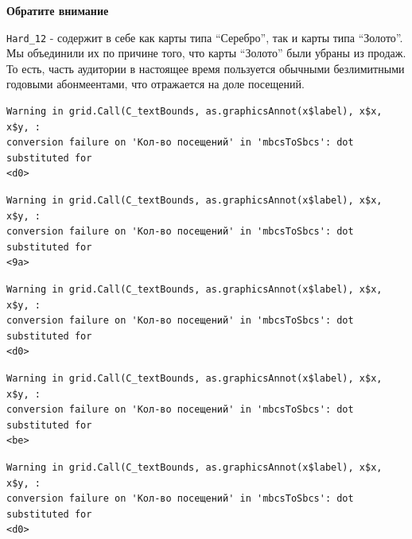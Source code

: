 \documentclass[
  letterpaper,
  DIV=11,
  numbers=noendperiod]{scrartcl}
\begin{document}
\begin{tcolorbox}[enhanced jigsaw, colframe=quarto-callout-important-color-frame, leftrule=.75mm, rightrule=.15mm, toprule=.15mm, left=2mm, arc=.35mm, bottomrule=.15mm, colback=white, breakable, opacityback=0]
\begin{minipage}[t]{5.5mm}
\textcolor{quarto-callout-important-color}{\faExclamation}
\end{minipage}%
\begin{minipage}[t]{\textwidth - 5.5mm}

\textbf{Обратите внимание}\vspace{2mm}

\texttt{Hard\_12} - содержит в себе как карты типа ``Серебро'', так и
карты типа ``Золото''. Мы объединили их по причине того, что карты
``Золото'' были убраны из продаж. То есть, часть аудитории в настоящее
время пользуется обычными безлимитными годовыми абонмеентами, что
отражается на доле посещений.

\end{minipage}%
\end{tcolorbox}

\begin{verbatim}
Warning in grid.Call(C_textBounds, as.graphicsAnnot(x$label), x$x, x$y, :
conversion failure on 'Кол-во посещений' in 'mbcsToSbcs': dot substituted for
<d0>
\end{verbatim}

\begin{verbatim}
Warning in grid.Call(C_textBounds, as.graphicsAnnot(x$label), x$x, x$y, :
conversion failure on 'Кол-во посещений' in 'mbcsToSbcs': dot substituted for
<9a>
\end{verbatim}

\begin{verbatim}
Warning in grid.Call(C_textBounds, as.graphicsAnnot(x$label), x$x, x$y, :
conversion failure on 'Кол-во посещений' in 'mbcsToSbcs': dot substituted for
<d0>
\end{verbatim}

\begin{verbatim}
Warning in grid.Call(C_textBounds, as.graphicsAnnot(x$label), x$x, x$y, :
conversion failure on 'Кол-во посещений' in 'mbcsToSbcs': dot substituted for
<be>
\end{verbatim}

\begin{verbatim}
Warning in grid.Call(C_textBounds, as.graphicsAnnot(x$label), x$x, x$y, :
conversion failure on 'Кол-во посещений' in 'mbcsToSbcs': dot substituted for
<d0>
\end{verbatim}
\end{document}
